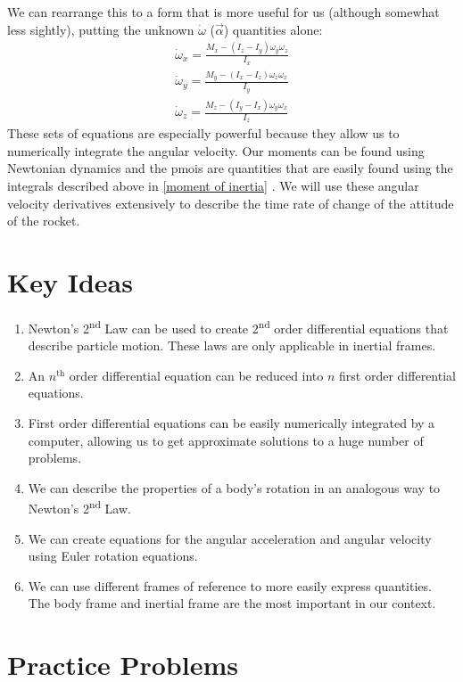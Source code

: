 \documentclass[10pt, openany, titlepage]{book}
\theoremstyle{definition}
\let\oldautoref\autoref
\renewcommand{\autoref}[1]{%
  \begingroup
  \hypersetup{linkcolor=black}%
  \oldautoref{#1}%
  \endgroup
}
\begin{document}
We can rearrange this to a form that is more useful for us (although somewhat less sightly), putting the unknown $\dot\omega$ ($\vec{\alpha}$) quantities alone:
\begin{gather}\label{eq: moment eq 2}
    \dot{\omega}_x=\frac{M_x-\left(I_z-I_y\right)\omega_y\omega_z}{I_x}\\
    \dot{\omega}_y=\frac{M_y-\left(I_x-I_z\right)\omega_z\omega_x}{I_y}\\
    \dot{\omega}_z=\frac{M_z-\left(I_y-I_x\right)\omega_y\omega_x}{I_z}
\end{gather}
These sets of equations are especially powerful because they allow us to numerically integrate the angular velocity. Our moments can be found using Newtonian dynamics and the \glspl{pmoi} are quantities that are easily found using the integrals described above in \autoref{moment of inertia}. We will use these angular velocity derivatives extensively to describe the time rate of change of the attitude of the rocket.


\section{Key Ideas}
\begin{enumerate}
    \item Newton's 2\textsuperscript{nd} Law can be used to create 2\textsuperscript{nd} order differential equations that describe particle motion. These laws are only applicable in inertial frames.
    \item An $n^{\mathrm{th}}$ order differential equation can be reduced into $n$ first order differential equations.
    \item First order differential equations can be easily numerically integrated by a computer, allowing us to get approximate solutions to a huge number of problems.
    \item We can describe the properties of a body's rotation in an analogous way to Newton's 2\textsuperscript{nd} Law.
    \item We can create equations for the angular acceleration and angular velocity using Euler rotation equations.
    \item We can use different frames of reference to more easily express quantities. The \gls{body frame} and \gls{inertial frame} are the most important in our context.
    
\end{enumerate}

\newpage
\section{Practice Problems}
\end{document}
